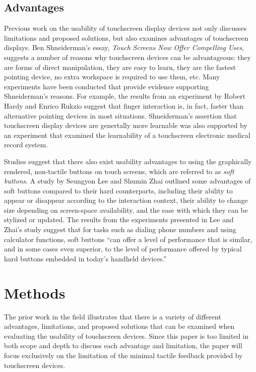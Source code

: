 \documentclass[11pt]{article}
\begin{document}
\subsection{Advantages}
Previous work on the usability of touchscreen display devices not only discusses limitations and proposed solutions, but also examines advantages of touchscreen displays. Ben Shneiderman's essay, \textit{Touch Screens Now Offer Compelling Uses}, suggests a number of reasons why touchscreen devices can be advantageous: they are forms of direct manipulation, they are easy to learn, they are the fastest pointing device, no extra workspace is required to use them, etc. \cite{73754} Many experiments have been conducted that provide evidence supporting Shneiderman's reasons. For example, the results from an experiment by Robert Hardy and Enrico Rukzio suggest that finger interaction is, in fact, faster than alternative pointing devices in most situations.\cite{Hardy:2008:TIT:1409240.1409267} Shneiderman's assertion that touchscreen display devices are genertally more learnable was also supported by an experiment that examined the learnability of a touchscreen electronic medical record system.\cite{Douglas:2011:SUL:2029976.2029990}

Studies suggest that there also exist usability advantages to using the graphically rendered, non-tactile buttons on touch screens, which are referred to as \textit{soft buttons}. A study by Seungyon Lee and Shumin Zhai outlined some advantages of soft buttons compared to their hard counterparts, including their ability to appear or disappear according to the interaction context, their ability to change size depending on screen-space availability, and the ease with which they can be stylized or updated.\cite{Lee:2009:PTS:1518701.1518750} The results from the experiments presented in Lee and Zhai's study suggest that for tasks such as  dialing phone numbers and using calculator functions, soft buttons ``can offer a level of performance that is similar, and in some cases even superior, to the level of performance offered by typical hard buttons embedded in today's handheld devices.'' \cite{Lee:2009:PTS:1518701.1518750}


\section{Methods}
The prior work in the field illustrates that there is a variety of different advantages, limitations, and proposed solutions that can be examined when evaluating the usability of touchscreen devices. Since this paper is too limited in both scope and depth to discuss each advantage and limitation, the paper will focus exclusively on the limitation of the minimal tactile feedback provided by touchscreen devices. 
\end{document}
